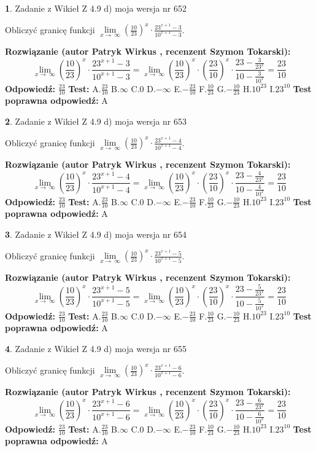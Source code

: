\documentclass[12pt, a4paper]{article}
\theoremstyle{definition} %
\newtheorem{zad}{}
\newcommand{\zadStart}[1]{\begin{zad}#1\newline}
\newcommand{\zadStop}{\end{zad}}
\newcommand{\rozwStart}[2]{\noindent \textbf{Rozwiązanie (autor #1 , recenzent #2): }\newline}
\newcommand{\rozwStop}{\newline}
\newcommand{\odpStart}{\noindent \textbf{Odpowiedź:}\newline}
\newcommand{\odpStop}{\newline}
\newcommand{\testStart}{\noindent \textbf{Test:}\newline}
\newcommand{\testStop}{\newline}
\newcommand{\kluczStart}{\noindent \textbf{Test poprawna odpowiedź:}\newline}
\newcommand{\kluczStop}{\newline}
\begin{document}
\zadStart{Zadanie z Wikieł Z 4.9 d) moja wersja nr 652}


Obliczyć granicę funkcji  $\lim\limits_{x\to\ \infty}(\frac{10}{23})^{x}\cdot\frac{23^{x+1}-3}{10^{x+1}-3}$.
\zadStop
\rozwStart{Patryk Wirkus}{Szymon Tokarski}
$$\lim\limits_{x\to\ \infty}(\frac{10}{23})^{x}\cdot\frac{23^{x+1}-3}{10^{x+1}-3}=\lim\limits_{x\to\ \infty}(\frac{10}{23})^{x}\cdot(\frac{23}{10})^{x} \cdot \frac{23-\frac{3}{23^{x}}}{10-\frac{3}{10^{x}}} = \frac{23}{10}$$
\rozwStop
\odpStart
$\frac{23}{10}$
\odpStop
\testStart
A.$\frac{23}{10}$ B.$\infty$ C.$0$ D.$-\infty$ E.$-\frac{23}{10}$
F.$\frac{10}{23}$ G.$-\frac{10}{23}$
H.$10^{23}$
I.$23^{10}$
\testStop
\kluczStart
A
\kluczStop



\zadStart{Zadanie z Wikieł Z 4.9 d) moja wersja nr 653}


Obliczyć granicę funkcji  $\lim\limits_{x\to\ \infty}(\frac{10}{23})^{x}\cdot\frac{23^{x+1}-4}{10^{x+1}-4}$.
\zadStop
\rozwStart{Patryk Wirkus}{Szymon Tokarski}
$$\lim\limits_{x\to\ \infty}(\frac{10}{23})^{x}\cdot\frac{23^{x+1}-4}{10^{x+1}-4}=\lim\limits_{x\to\ \infty}(\frac{10}{23})^{x}\cdot(\frac{23}{10})^{x} \cdot \frac{23-\frac{4}{23^{x}}}{10-\frac{4}{10^{x}}} = \frac{23}{10}$$
\rozwStop
\odpStart
$\frac{23}{10}$
\odpStop
\testStart
A.$\frac{23}{10}$ B.$\infty$ C.$0$ D.$-\infty$ E.$-\frac{23}{10}$
F.$\frac{10}{23}$ G.$-\frac{10}{23}$
H.$10^{23}$
I.$23^{10}$
\testStop
\kluczStart
A
\kluczStop



\zadStart{Zadanie z Wikieł Z 4.9 d) moja wersja nr 654}


Obliczyć granicę funkcji  $\lim\limits_{x\to\ \infty}(\frac{10}{23})^{x}\cdot\frac{23^{x+1}-5}{10^{x+1}-5}$.
\zadStop
\rozwStart{Patryk Wirkus}{Szymon Tokarski}
$$\lim\limits_{x\to\ \infty}(\frac{10}{23})^{x}\cdot\frac{23^{x+1}-5}{10^{x+1}-5}=\lim\limits_{x\to\ \infty}(\frac{10}{23})^{x}\cdot(\frac{23}{10})^{x} \cdot \frac{23-\frac{5}{23^{x}}}{10-\frac{5}{10^{x}}} = \frac{23}{10}$$
\rozwStop
\odpStart
$\frac{23}{10}$
\odpStop
\testStart
A.$\frac{23}{10}$ B.$\infty$ C.$0$ D.$-\infty$ E.$-\frac{23}{10}$
F.$\frac{10}{23}$ G.$-\frac{10}{23}$
H.$10^{23}$
I.$23^{10}$
\testStop
\kluczStart
A
\kluczStop



\zadStart{Zadanie z Wikieł Z 4.9 d) moja wersja nr 655}


Obliczyć granicę funkcji  $\lim\limits_{x\to\ \infty}(\frac{10}{23})^{x}\cdot\frac{23^{x+1}-6}{10^{x+1}-6}$.
\zadStop
\rozwStart{Patryk Wirkus}{Szymon Tokarski}
$$\lim\limits_{x\to\ \infty}(\frac{10}{23})^{x}\cdot\frac{23^{x+1}-6}{10^{x+1}-6}=\lim\limits_{x\to\ \infty}(\frac{10}{23})^{x}\cdot(\frac{23}{10})^{x} \cdot \frac{23-\frac{6}{23^{x}}}{10-\frac{6}{10^{x}}} = \frac{23}{10}$$
\rozwStop
\odpStart
$\frac{23}{10}$
\odpStop
\testStart
A.$\frac{23}{10}$ B.$\infty$ C.$0$ D.$-\infty$ E.$-\frac{23}{10}$
F.$\frac{10}{23}$ G.$-\frac{10}{23}$
H.$10^{23}$
I.$23^{10}$
\testStop
\kluczStart
A
\kluczStop
\end{document}
